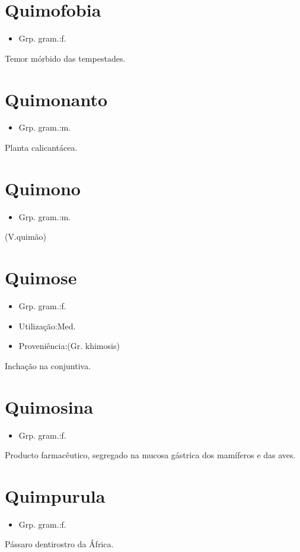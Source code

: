 \section{Quimofobia}
\begin{itemize}
\item {Grp. gram.:f.}
\end{itemize}
Temor mórbido das tempestades.
\section{Quimonanto}
\begin{itemize}
\item {Grp. gram.:m.}
\end{itemize}
Planta calicantácea.
\section{Quimono}
\begin{itemize}
\item {Grp. gram.:m.}
\end{itemize}
(V.quimão)
\section{Quimose}
\begin{itemize}
\item {Grp. gram.:f.}
\end{itemize}
\begin{itemize}
\item {Utilização:Med.}
\end{itemize}
\begin{itemize}
\item {Proveniência:(Gr. \textunderscore khimosis\textunderscore )}
\end{itemize}
Inchação na conjuntiva.
\section{Quimosina}
\begin{itemize}
\item {Grp. gram.:f.}
\end{itemize}
Producto farmacêutico, segregado na mucosa gástrica dos mamíferos e das aves.
\section{Quimpurula}
\begin{itemize}
\item {Grp. gram.:f.}
\end{itemize}
Pássaro dentirostro da África.
